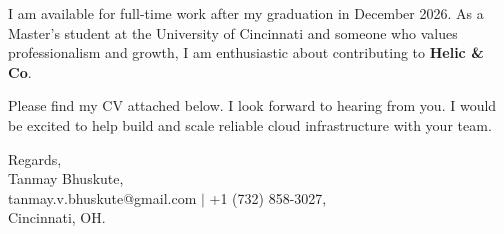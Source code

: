 \documentclass[11pt]{letter}
\begin{document}
\begin{letter}{}
I am available for full-time work after my graduation in December 2026. As a Master's student at the University of Cincinnati and someone who values professionalism and growth, I am enthusiastic about contributing to \textbf{Helic \& Co}.

Please find my CV attached below. I look forward to hearing from you. I would be excited to help build and scale reliable cloud infrastructure with your team.

{\setlength{\parskip}{0pt}
Regards,\\
Tanmay Bhuskute,\\
tanmay.v.bhuskute@gmail.com $\mid$ +1 (732) 858-3027,\\
Cincinnati, OH.
}

\end{letter}
\end{document}
